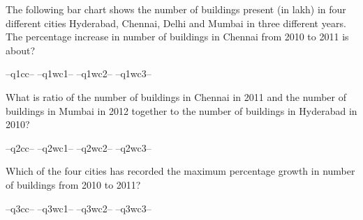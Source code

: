 \question   The following bar chart shows the number of buildings present (in lakh) in four different cities Hyderabad, Chennai, Delhi and Mumbai in three different years.  The percentage increase in number of buildings in Chennai from 2010 to 2011 is about?

    
\begin{randomizechoices}
\correctchoice --q1cc-- 
\choice --q1wc1--  
\choice --q1wc2-- 
\choice --q1wc3-- 
\end{randomizechoices}

\question   What is ratio of the number of buildings in Chennai in 2011 and the number of buildings in Mumbai in 2012 together to the number of buildings in Hyderabad in 2010?

\begin{randomizechoices}
\correctchoice --q2cc-- 
\choice --q2wc1--  
\choice --q2wc2-- 
\choice --q2wc3-- 
\end{randomizechoices}

\question   Which of the four cities has recorded the maximum percentage growth in number of buildings from 2010 to 2011?

\begin{randomizechoices}
\correctchoice --q3cc-- 
\choice --q3wc1--  
\choice --q3wc2-- 
\choice --q3wc3-- 
\end{randomizechoices}

